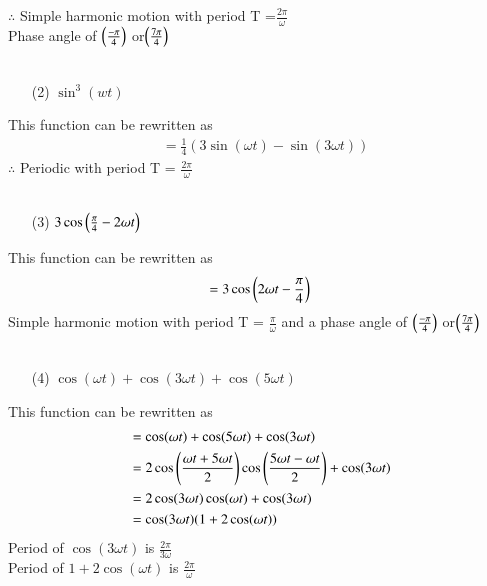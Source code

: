 \documentclass[journal,12pt,twocolumn]{IEEEtran}
\theoremstyle{remark}
\begin{document}
 $\therefore$ Simple harmonic motion with period {T} =$\frac{2\pi}{\omega}$\\ Phase angle of $\left(\frac{-\pi}{4}\right)$ or$\left(\frac{7\pi}{4}\right)$\\
\\
\begin{enumerate}
    \item[(2)] $\sin^3(wt)$\\
\end{enumerate}
 This function can be rewritten as\\ 
 \begin{align}
  &=\frac{1}{4}(3\sin(\omega t)-\sin(3 \omega t))
 \end{align}
 $\therefore$ Periodic with period {T} = $\frac{2\pi}{\omega}$ \\
\\
\begin{enumerate}
    \item[(3)] $3\cos\left(\frac{\pi}{4}-2\omega t\right)$\\
\end{enumerate}
This function can be rewritten as\\ 
 \begin{align}
  =3\cos\left(2\omega t-\frac{\pi}{4}\right)\\
 \end{align}
 Simple harmonic motion with period {T} = $\frac{\pi}{\omega}$  and a phase angle of  $\left(\frac{-\pi}{4}\right)$ or$\left(\frac{7\pi}{4}\right)$\\
 \\
 \begin{enumerate}
 \item[(4)]  $\cos(\omega t)+\cos(3\omega t)+\cos(5\omega t)$\\
\end{enumerate}
This function can be rewritten as\\ 
 \begin{align}
  &=\cos(\omega t)+\cos(5\omega t)+\cos(3\omega t)\\
  &=2\cos\left(\frac{\omega t+5\omega t}{2}\right)\cos\left(\frac{5\omega t-\omega t}{2}\right) +\cos(3\omega t)\\
  &=2\cos(3\omega t) \cos(\omega t)+\cos(3\omega t)\\
  &=\cos(3\omega t) (1+2\cos(\omega t))
 \end{align}
 Period of $\cos(3\omega t)$ is $\frac{2\pi}{3\omega}$\\ 
 Period of $1+2\cos(\omega t)$ is $\frac{2\pi}{\omega}$\\ 
\end{document}
